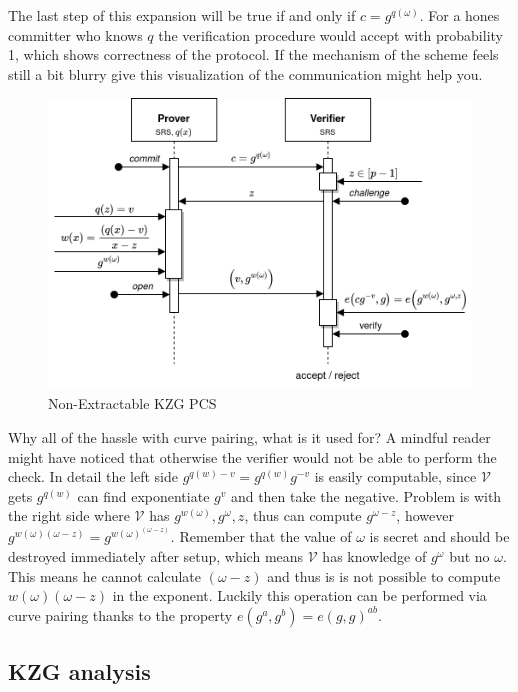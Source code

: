 The last step of this expansion will be true if and only if $c = g^{q(\omega)}$. For a hones committer who knows $q$ the verification procedure would accept with probability 1, which shows correctness of the protocol. If the mechanism of the scheme feels still a bit blurry give this visualization of the communication might help you. 

\begin{figure}[H]
    \centering
    \includegraphics[width=\textwidth]{figures/kzg_diagram.png}
    \caption{Non-Extractable KZG PCS}
\end{figure}

Why all of the hassle with curve pairing, what is it used for? A mindful reader might have noticed that otherwise the verifier would not be able to perform the check. In detail the left side $g^{q(w) - v} = g^{q(w)} g^{-v}$ is easily computable, since $\mathcal{V}$ gets $g^{q(w)}$ can find exponentiate $g^v$ and then take the negative. Problem is with the right side where $\mathcal{V}$ has $g^{w(\omega)}, g^\omega, z$, thus can compute $g^{\omega - z}$, however $g^{w(\omega) (\omega - z)} = g^{w(\omega)^{(\omega - z)}}$. Remember that the value of $\omega$ is secret and should be destroyed immediately after setup, which means $\mathcal{V}$ has knowledge of $g^\omega$ but no $\omega$. This means he cannot calculate $(\omega - z)$ and thus is is not possible to compute $w(\omega) (\omega - z)$ in the exponent. Luckily this operation can be performed via curve pairing thanks to the property $e(g^a, g^b) = e(g, g)^{ab}$.

\subsection{KZG analysis}
\label{chap:kzg}

